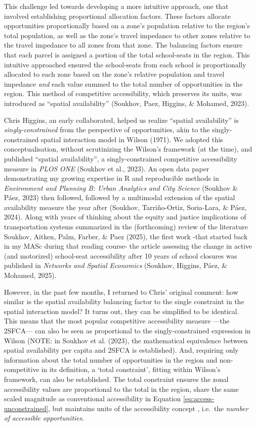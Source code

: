\documentclass[
11pt, %
oneside, %
english, %
singlespacing, %
]{macthesis} %
\begin{document}
This challenge led towards developing a more intuitive approach, one that involved establishing proportional allocation factors. These factors allocate opportunities proportionally based on a zone's population relative to the region's total population, as well as the zone's travel impedance to other zones relative to the travel impedance to all zones from that zone. The balancing factors ensure that each parcel is assigned a portion of the total school-seats in the region. This intuitive approached ensured the school-seats from each school is proportionally allocated to each zone based on the zone's relative population and travel impedance \emph{and} each value summed to the total number of opportunities in the region. This method of competitive accessibility, which preserves its units, was introduced as ``spatial availability'' (Soukhov, Paez, Higgins, \& Mohamed, 2023).

Chris Higgins, an early collaborated, helped us realize ``spatial availability'' is \emph{singly-constrained} from the perspective of opportunities, akin to the singly-constrained spatial interaction model in Wilson (1971). We adopted this conceptualisation, without scrutinizing the Wilson's framework (at the time), and published ``spatial availability'', a singly-constrained competitive accessibility measure in \emph{PLOS ONE} (Soukhov et al., 2023). An open data paper demonstrating my growing expertise in R and reproducible methods in \emph{Environment and Planning B: Urban Analytics and City Science} (Soukhov \& Páez, 2023) then followed, followed by a multimodal extension of the spatial availability measure the year after (Soukhov, Tarriño-Ortiz, Soria-Lara, \& Páez, 2024). Along with years of thinking about the equity and justice implications of transportation systems summarized in the (forthcoming) review of the literature Soukhov, Aitken, Palm, Farber, \& Paez (2025), the first work -that started back in my MASc during that reading course- the article assessing the change in active (and motorized) school-seat accessibility after 10 years of school closures was published in \emph{Networks and Spatial Economics} (Soukhov, Higgins, Páez, \& Mohamed, 2025).

However, in the past few months, I returned to Chris' original comment: how similar is the spatial availability balancing factor to the single constraint in the spatial interaction model? It turns out, they can be simplified to be identical. This means that the most popular competitive accessibility measure ---the 2SFCA--- can also be seen as proportional to the singly-constrained expression in Wilson (NOTE: in Soukhov et al. (2023), the mathematical equivalence between spatial availability per capita and 2SFCA is established). And, requiring only information about the total number of opportunities in the region and non-competitive in its definition, a `total constraint', fitting within Wilson's framework, can also be established. The total constraint ensures the zonal accessibility values are proportional to the total in the region, share the same scaled magnitude as conventional accessibility in Equation \ref{eq:access-unconstrained}, but maintains units of the accessibility concept , i.e.~the \emph{number of accessible opportunities}.
\end{document}

